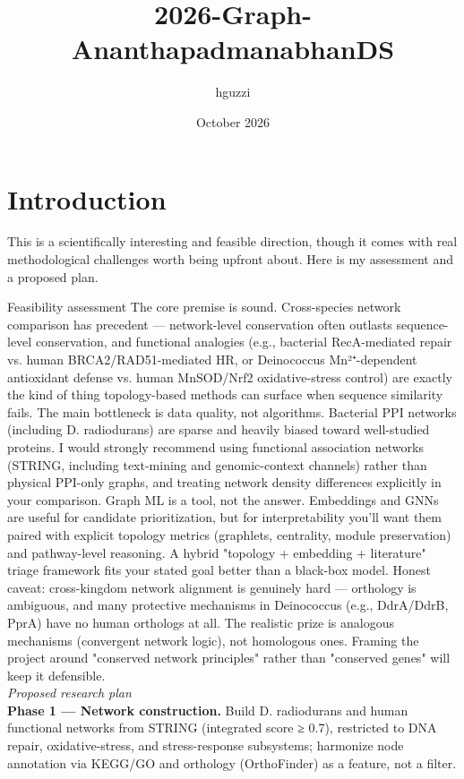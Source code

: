 \documentclass{article}
\title{2026-Graph-AnanthapadmanabhanDS}
\author{hguzzi }
\date{October 2026}
\begin{document}
\maketitle

\section{Introduction}
This is a scientifically interesting and feasible direction, though it comes with real methodological challenges worth being upfront about. Here is my assessment and a proposed plan.

Feasibility assessment
The core premise is sound. Cross-species network comparison has precedent — network-level conservation often outlasts sequence-level conservation, and functional analogies (e.g., bacterial RecA-mediated repair vs. human BRCA2/RAD51-mediated HR, or Deinococcus Mn²⁺-dependent antioxidant defense vs. human MnSOD/Nrf2 oxidative-stress control) are exactly the kind of thing topology-based methods can surface when sequence similarity fails.
The main bottleneck is data quality, not algorithms. Bacterial PPI networks (including D. radiodurans) are sparse and heavily biased toward well-studied proteins. I would strongly recommend using functional association networks (STRING, including text-mining and genomic-context channels) rather than physical PPI-only graphs, and treating network density differences explicitly in your comparison.
Graph ML is a tool, not the answer. Embeddings and GNNs are useful for candidate prioritization, but for interpretability you'll want them paired with explicit topology metrics (graphlets, centrality, module preservation) and pathway-level reasoning. A hybrid "topology + embedding + literature" triage framework fits your stated goal better than a black-box model.
Honest caveat: cross-kingdom network alignment is genuinely hard — orthology is ambiguous, and many protective mechanisms in Deinococcus (e.g., DdrA/DdrB, PprA) have no human orthologs at all. The realistic prize is analogous mechanisms (convergent network logic), not homologous ones. Framing the project around "conserved network principles" rather than "conserved genes" will keep it defensible.\\
\textit{Proposed research plan}\\
\textbf{Phase 1 — Network construction.} Build D. radiodurans and human functional networks from STRING (integrated score ≥ 0.7), restricted to DNA repair, oxidative-stress, and stress-response subsystems; harmonize node annotation via KEGG/GO and orthology (OrthoFinder) as a feature, not a filter.\\
\end{document}
